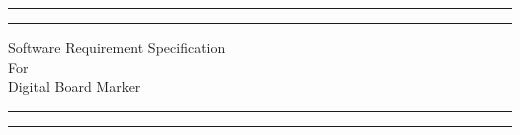 \documentclass[12pt]{article}
\begin{document}

\begin{titlepage} %

	\centering %
	
	\scshape %
	
	\vspace*{\baselineskip} %
	
	
	\rule{\textwidth}{1.6pt}\vspace*{-\baselineskip}\vspace*{2pt} %
	\rule{\textwidth}{0.4pt} %
	
	\vspace{0.75\baselineskip} %
	
	{\LARGE Software Requirement Specification\\ For\\ Digital Board Marker\\} %
	
	\vspace{0.75\baselineskip} %
	
	\rule{\textwidth}{0.4pt}\vspace*{-\baselineskip}\vspace{3.2pt} %
	\rule{\textwidth}{1.6pt} %
	
	\vspace{2\baselineskip} %
	
	


\end{titlepage}
\end{document}
